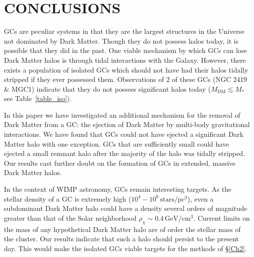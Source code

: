\documentclass[aps,floatfix,prd,showpacs]{revtex4}
\newcommand{\rhox}{\rho_\chi}
\newcommand{\MDM}{M_{\mathrm{DM}}}
\newcommand{\pc}{\textrm{pc}}
\newcommand{\Gev}{\textrm{GeV}}
\newcommand{\cm}{\textrm{cm}}
\begin{document}
\section{CONCLUSIONS}
\label{section:conclusions3}


GCs are peculiar systems in that they are the largest structures in the Universe not dominated by Dark Matter. Though they do not possess halos today, it is possible that they did in the past. One viable mechanism by which GCs can lose Dark Matter halos is through tidal interactions with the Galaxy. However, there exists a population of isolated GCs which should not have had their halos tidally stripped if they ever possessed them. Observations of 2 of these GCs (NGC 2419 \& MGC1) indicate that they do not possess significant halos today ($\MDM \lesssim M_*$ see Table~\ref{table_iso}).

In this paper we have investigated an additional mechanism for the removal of Dark Matter from a GC: the ejection of Dark Matter by multi-body gravitational interactions. We have found that GCs could not have ejected a significant Dark Matter halo with one exception. GCs that are sufficiently small could have ejected a small remnant halo after the majority of the halo was tidally stripped. Our results cast further doubt on the formation of GCs in extended, massive Dark Matter halos.

In the context of WIMP astronomy, GCs remain interesting targets.  As the stellar density of a GC is extremely high ($10^4-10^6\, \mathrm{stars}/\pc^3$), even a subdominant Dark Matter halo could have a density several orders of magnitude greater than that of the Solar neighborhood $\rhox \sim 0.4\, \Gev/\cm^3$.  Current limits on the mass of any hypothetical Dark Matter halo are of order the stellar mass of the cluster.  Our results indicate that such a halo should persist to the present day.  This would make the isolated GCs viable targets for the methods of \S\ref{Ch2}.    


\acknowledgments


\end{document}
